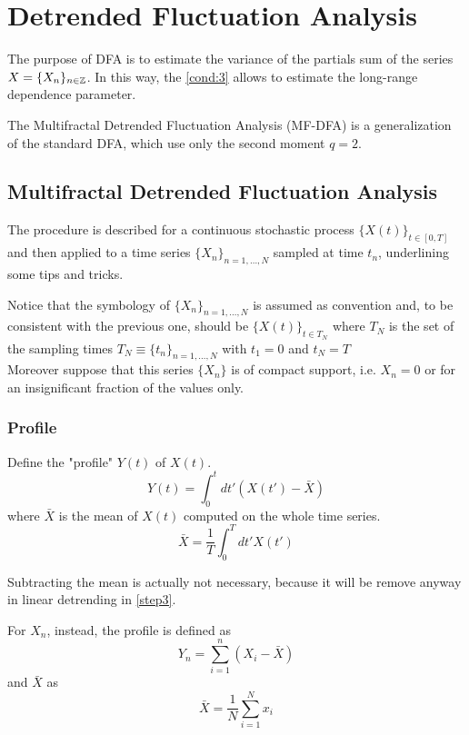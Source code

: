\section{Detrended Fluctuation Analysis}


The purpose of DFA is to estimate the variance of the partials sum of the series $X = \{ X_n \}_{n \in \mathbb{Z}}$. In this way, the \autoref{cond:3} allows to estimate the long-range dependence parameter. 

The Multifractal Detrended Fluctuation Analysis (MF-DFA) is a generalization of the standard DFA, which use only the second moment $q = 2$. 

\subsection{Multifractal Detrended Fluctuation Analysis}
The procedure is described for a continuous stochastic process $\{X(t)\}_{t\in [0, T]}$ and then applied to a time series $\{ X_n \}_{n = 1, \dots, N} $ sampled at time $t_n$, underlining some tips and tricks. 

Notice that the symbology of $\{ X_n \}_{n = 1, \dots, N} $ is assumed as convention and, to be consistent with the previous one, should be
$\{ X(t) \}_{t \in T_N}$ where $T_N$ is the set of the sampling times $T_N \equiv \{ t_n\}_{n = 1, \dots, N}$ with $t_1 = 0$ and $t_N = T$ \\
Moreover suppose that this series $\{ X_n \}$ is of compact support, i.e. $X_n = 0$ or for an insignificant fraction of the values only. 

\subsubsection{Profile}\label{step1}
Define the "profile" $Y(t)$ of $X(t)$.
\begin{equation}
	Y( t ) = \int_{0}^{t} dt' (X( t' ) - \bar{X} ) 
\end{equation}
where $\bar{X}$ is the mean of $X(t)$ computed on the whole time series.
\begin{equation}
	\bar{X} = \frac{1}{T} \int_{0}^{T} dt' X( t' )
\end{equation}

Subtracting the mean is actually not necessary, because it will be remove anyway in linear detrending in \autoref{step3}.

For $X_n$, instead, the profile is defined as 
\begin{equation}
	Y_n = \sum_{i=1}^{n} \left( X_i - \bar{X} \right)
\end{equation}
and $\bar{X}$ as 
\begin{equation}
	\bar{X} = \frac{1}{N} \sum_{i=1}^{N} x_i 
\end{equation}

